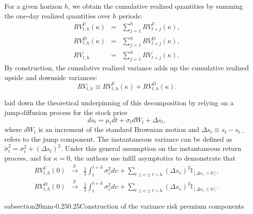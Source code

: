 \documentclass[11pt]{article}
\makeatletter
\renewcommand\subsection{\@startsection%
    {subsection}{2}{0mm}{-0.25\baselineskip}{0.25\baselineskip}{\bfseries\large}}
\makeatother
\begin{document}
For a given horizon $h$, we obtain the cumulative realized quantities by summing the one-day realized quantities over $h$ periods:
\begin{eqnarray}
RV_{t,h}^{U}(\kappa )&=&\sum_{j=1}^{h}RV^U_{t+j}(\kappa),\nonumber\\
RV_{t,h}^{D}(\kappa )&=&\sum_{j=1}^{h}RV^D_{t+j}(\kappa),\nonumber\\
RV_{t,h}&=&\sum_{j=1}^{h}RV_{t+j}(\kappa ).\label{AggregationRV}
\end{eqnarray}
By construction, the cumulative realized variance adds up the cumulative realized upside and downside variances:
\begin{equation}
RV_{t,h}\equiv RV_{t,h}^{U}(\kappa )+ RV_{t,h}^{D}(\kappa ).\label{EqDecomposeRV}
\end{equation}

\cite{BNKinnShep} laid down the theoretical underpinning of this decomposition by relying on a jump-diffusion process for the stock price
\begin{equation*}
    ds_{t}=\mu_{t}dt+\sigma_{t}dW_{t}+\Delta s_{t},
\end{equation*}
where $dW_{t}$ is an increment of the standard Brownian motion and $\Delta s_{t}\equiv s_{t}-s_{t-}$ refers to the jump component. The instantaneous variance can be defined as $\widetilde{\sigma}_{t}^2=\sigma_{t}^2+\left(\Delta s_{t}\right)^2$. Under this general assumption on the instantaneous return process, and for $\kappa=0$, the authors use infill asymptotics to demonstrate that
\begin{eqnarray*}
  RV_{t,h}^{U}(0) &\overset{p}{\rightarrow}& \frac{1}{2}\int_{t}^{t+h}\sigma_{\upsilon}^2 d\upsilon+\sum_{t\leq \upsilon\leq t+h} \left(\Delta s_{\upsilon}\right)^2 \mathbb{I}_{[\Delta s_{\upsilon} > 0]}, \\
  RV_{t,h}^{D}(0) &\overset{p}{\rightarrow}& \frac{1}{2}\int_{t}^{t+h}\sigma_{\upsilon}^2 d\upsilon +\sum_{t\leq \upsilon\leq t+h} \left(\Delta s_{\upsilon}\right)^2 \mathbb{I}_{[\Delta s_{\upsilon}\leq 0]}.
\end{eqnarray*}


\subsection{Construction of the variance risk premium components}\label{SecVolPremDec}
\end{document}
